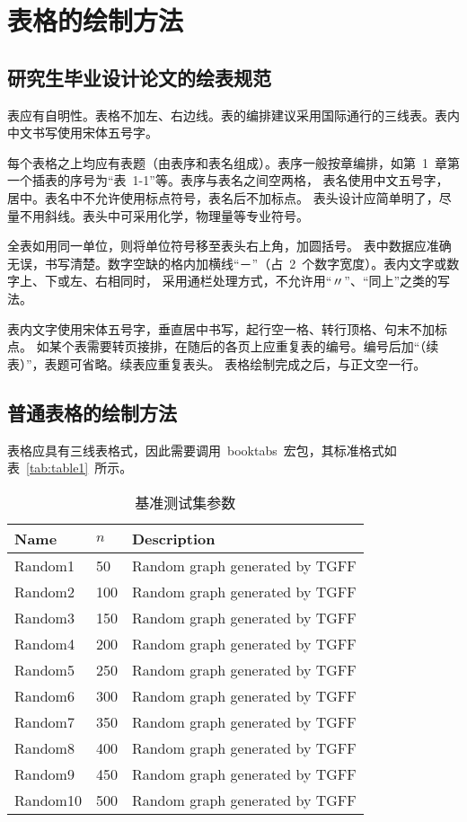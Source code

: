 
\chapter{表格的绘制方法}
\section{研究生毕业设计论文的绘表规范}

表应有自明性。表格不加左、右边线。表的编排建议采用国际通行的三线表。表内中文书写使用宋体五号字。

每个表格之上均应有表题（由表序和表名组成）。表序一般按章编排，如第~1~章第一个插表的序号为“表~1-1”等。表序与表名之间空两格，
表名使用中文五号字，居中。表名中不允许使用标点符号，表名后不加标点。
表头设计应简单明了，尽量不用斜线。表头中可采用化学，物理量等专业符号。

全表如用同一单位，则将单位符号移至表头右上角，加圆括号\cite{djy}。
表中数据应准确无误，书写清楚。数字空缺的格内加横线“－”（占~2~个数字宽度）。表内文字或数字上、下或左、右相同时，
采用通栏处理方式，不允许用“〃”、“同上”之类的写法。

表内文字使用宋体五号字，垂直居中书写，起行空一格、转行顶格、句末不加标点。
如某个表需要转页接排，在随后的各页上应重复表的编号。编号后加“（续表）”，表题可省略。续表应重复表头。
表格绘制完成之后，与正文空一行。

\section{普通表格的绘制方法}

表格应具有三线表格式，因此需要调用~booktabs~宏包，其标准格式如表~\ref{tab:table1}~所示。

\renewcommand\arraystretch{1.5}%
\begin{table}[!h]
\caption{基准测试集参数}\label{tab:bench}
\vspace{0.5em}
\centering
\begin{tabular}{l*{1}{C{2cm}}*{1}{L{6.2cm}}}
\toprule
Name         & $n$ & Description\\
\midrule
Random1      & 50  & Random graph generated by TGFF\\
Random2      & 100 & Random graph generated by TGFF\\
Random3      & 150 & Random graph generated by TGFF\\
Random4      & 200 & Random graph generated by TGFF\\
Random5      & 250 & Random graph generated by TGFF\\
Random6      & 300 & Random graph generated by TGFF\\
Random7      & 350 & Random graph generated by TGFF\\
Random8      & 400 & Random graph generated by TGFF\\
Random9      & 450 & Random graph generated by TGFF\\
Random10     & 500 & Random graph generated by TGFF\\
\bottomrule
\end{tabular}
\vspace{\baselineskip}
\end{table}
\renewcommand\arraystretch{1}

